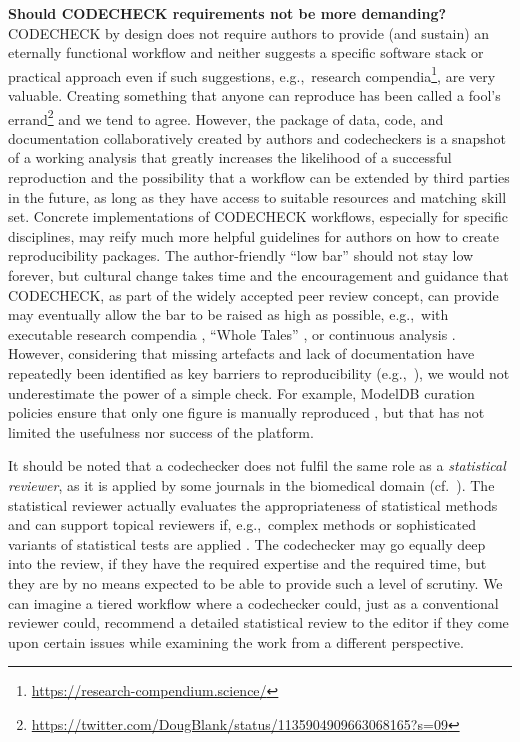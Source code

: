 \documentclass[12pt]{article}
\begin{document}
\textbf{Should CODECHECK requirements not be more demanding?} \\
CODECHECK by design does not require authors to provide (and sustain) an
eternally functional workflow and neither suggests a specific software stack
or practical approach even if such suggestions, e.g.,~research compendia\footnote{\url{https://research-compendium.science/}}, are very valuable.
Creating something that anyone can reproduce has been called a 
fool's errand\footnote{\url{https://twitter.com/DougBlank/status/1135904909663068165?s=09}}
and we tend to agree.
However, the package of data, code, and documentation
collaboratively created by authors and codecheckers is a snapshot of a 
working analysis that greatly increases the likelihood of a successful 
reproduction and the possibility that a workflow can be extended by third parties in the future, as long as they have access
to suitable resources and matching skill set.
Concrete implementations of CODECHECK workflows, especially for specific
disciplines, may reify much more helpful guidelines for authors on how to
create reproducibility packages.
The author-friendly ``low bar'' should not stay low forever, but cultural
change takes time and the encouragement and guidance that CODECHECK,
as part of the widely accepted peer review concept, can provide may
eventually allow the bar to be raised as high as possible, e.g.,~with
executable research compendia \cite{nust_opening_2017}, ``Whole Tales'' \cite{brinckman_computing_2018},
or continuous analysis \cite{beaulieu-jones_reproducibility_2017-1}.
However, considering that missing artefacts and lack of documentation
have repeatedly been identified as key barriers to reproducibility
(e.g.,~\cite{stagge_assessing_2019,nust_improving_2020}),
we would not underestimate the power of a simple check.
For example, ModelDB curation policies ensure that only one figure is manually reproduced \cite{mcdougal_reproducibility_2016}, but that has not limited the usefulness nor success of the platform.

It should be noted that a codechecker does not fulfil the same role as a
\emph{statistical reviewer}, as it is applied by some journals in the 
biomedical domain (cf.~\cite{petrovecki_role_2009,greenwood_how_2015}).
The statistical reviewer actually evaluates the appropriateness of
statistical methods \cite{greenwood_how_2015} and can support topical
reviewers if, e.g.,~complex methods or sophisticated variants of statistical
tests are applied \cite{petrovecki_role_2009}.
The codechecker may go equally deep into the review, if they have
the required expertise and the required time, 
but they are by no means expected to be able to provide
such a level of scrutiny. We can imagine a tiered workflow where a 
codechecker could, just as a conventional reviewer could, recommend a detailed
statistical review to the editor if they come upon certain issues while
examining the work from a different perspective.
\end{document}
